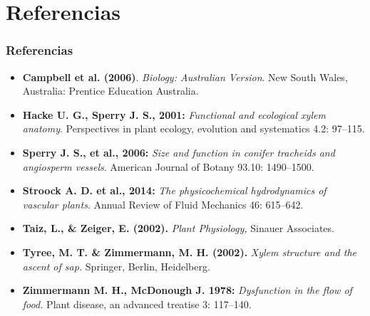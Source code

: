 \documentclass[usepdftitle=false]{beamer}
\newenvironment{changemargin}[2]{%
\begin{list}{}{%
\setlength{\topsep}{0pt}%
\setlength{\leftmargin}{#1}%
\setlength{\rightmargin}{#2}%
\setlength{\listparindent}{\parindent}%
\setlength{\itemindent}{\parindent}%
\setlength{\parsep}{\parskip}%
}%
\item[]}{\end{list}}
\begin{document}
\section{Referencias}
\begin{frame}%
\frametitle{Referencias}\label{bib}
\color{black}
\begin{changemargin}{-1.5em}{-1.5em}
 { \footnotesize \justifying
\begin{itemize}
\item \textbf{Campbell et al. (2006)}. \textit{Biology: Australian Version}. New South Wales, Australia: Prentice Education Australia.
 \item \textbf{Hacke U. G., Sperry J. S., 2001:} \textit{Functional and ecological xylem anatomy}. Perspectives in plant ecology, evolution and systematics 4.2: 97--115.
\item \textbf{Sperry J. S., et al., 2006:} \textit{Size and function in conifer tracheids and angiosperm vessels}. American Journal of Botany 93.10: 1490--1500.
 \item \textbf{Stroock A. D. et al., 2014:} \textit{The physicochemical hydrodynamics of vascular plants}. Annual Review of Fluid Mechanics 46: 615--642.
 \item \textbf{Taiz, L., \& Zeiger, E. (2002).} \textit{Plant Physiology,} Sinauer Associates.
 \item   \textbf{Tyree, M. T. \& Zimmermann, M. H. (2002).}\textit{ Xylem structure and the ascent of sap.} Springer, Berlin, Heidelberg.
 \item \textbf{Zimmermann M. H., McDonough J. 1978:} \textit{Dysfunction in the flow of food.} Plant disease, an advanced treatise 3: 117--140.
 \end{itemize}
} 

\end{changemargin}
\end{frame}
\end{document}
